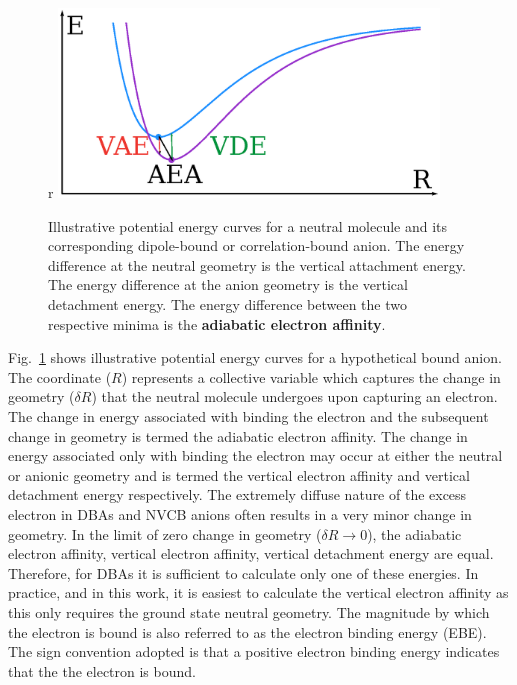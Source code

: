 \begin{figure}{r}
	\centering
	\includegraphics[width=0.9\textwidth,keepaspectratio]{Images/chapter1/morse.eps}
	\caption{Illustrative potential energy curves for a neutral molecule and its corresponding dipole-bound or correlation-bound anion. The energy difference at the neutral geometry is the vertical attachment energy. The energy difference at the anion geometry is the vertical detachment energy. The energy difference between the two respective minima is the \textbf{adiabatic electron affinity}.}
	\label{fig:morse}
\end{figure}

Fig.~\ref{fig:morse} shows illustrative potential energy curves for a hypothetical bound anion.
The coordinate ($R$) represents a collective variable which captures the change in geometry ($\delta R$) that the neutral molecule undergoes upon capturing an electron.
The change in energy associated with binding the electron and the subsequent change in geometry is termed the adiabatic electron affinity.
The change in energy associated only with binding the electron may occur at either the neutral or anionic geometry and is termed the vertical electron affinity and vertical detachment energy respectively.
The extremely diffuse nature of the excess electron in DBAs and NVCB anions often results in a very minor change in geometry.
In the limit of zero change in geometry ($\delta R \rightarrow 0$), the adiabatic electron affinity, vertical electron affinity, vertical detachment energy are equal.
Therefore, for DBAs it is sufficient to calculate only one of these energies.
In practice, and in this work, it is easiest to calculate the vertical electron affinity as this only requires the ground state neutral geometry.
The magnitude by which the electron is bound is also referred to as the electron binding energy (EBE).
The sign convention adopted is that a positive electron binding energy indicates that the the electron is bound.
